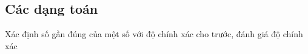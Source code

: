 \subsection{Các dạng toán}
\begin{dang}{Xác định số gần đúng của một số với độ chính xác cho trước, đánh giá độ chính xác}
\end{dang}
\viduminhhoa
